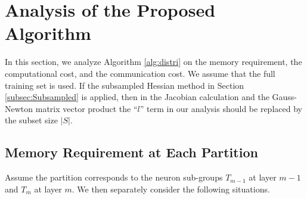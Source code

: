\documentclass[12pt]{article}
\begin{document}
\section{Analysis of the Proposed Algorithm}
\label{sec:Analyze-algo}
In this section, we analyze Algorithm \ref{alg:distri} on the memory requirement, the computational cost, and the communication cost. 
We assume that the full training set is used. If the 
subsampled Hessian method in Section \ref{subsec:Subsampled} is applied, 
then in the Jacobian calculation and the Gauss-Newton matrix vector product the ``$l$'' term in our analysis should be replaced by 
the subset size $|S|$.
\subsection{Memory Requirement at Each Partition}
\label{subsec:Memory}
Assume the partition corresponds to the neuron sub-groups $T_{m-1}$ at layer $m-1$ and $T_m$ at layer $m$.
We then separately consider the following situations.
\end{document}
